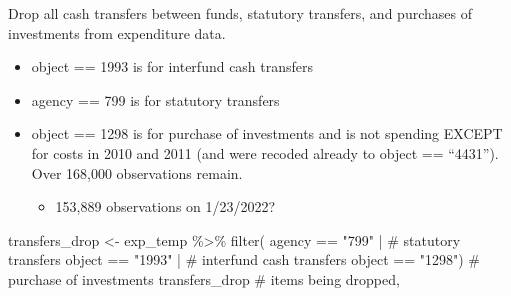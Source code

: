 \documentclass[
  letterpaper,
  DIV=11,
  numbers=noendperiod]{scrreport}
\newenvironment{Shaded}{\begin{snugshade}}{\end{snugshade}}
\newcommand{\CommentTok}[1]{\textcolor[rgb]{0.37,0.37,0.37}{#1}}
\newcommand{\FunctionTok}[1]{\textcolor[rgb]{0.28,0.35,0.67}{#1}}
\newcommand{\NormalTok}[1]{\textcolor[rgb]{0.00,0.23,0.31}{#1}}
\newcommand{\OtherTok}[1]{\textcolor[rgb]{0.00,0.23,0.31}{#1}}
\newcommand{\SpecialCharTok}[1]{\textcolor[rgb]{0.37,0.37,0.37}{#1}}
\newcommand{\StringTok}[1]{\textcolor[rgb]{0.13,0.47,0.30}{#1}}
\providecommand{\tightlist}{%
  \setlength{\itemsep}{0pt}\setlength{\parskip}{0pt}}\usepackage{longtable,booktabs,array}
\begin{document}
Drop all cash transfers between funds, statutory transfers, and
purchases of investments from expenditure data.

\begin{itemize}
\tightlist
\item
  object == 1993 is for interfund cash transfers
\item
  agency == 799 is for statutory transfers
\item
  object == 1298 is for purchase of investments and is not spending
  EXCEPT for costs in 2010 and 2011 (and were recoded already to object
  == ``4431''). Over 168,000 observations remain.

  \begin{itemize}
  \tightlist
  \item
    153,889 observations on 1/23/2022?
  \end{itemize}
\end{itemize}

\begin{Shaded}
\begin{Highlighting}[]
\NormalTok{transfers\_drop }\OtherTok{\textless{}{-}}\NormalTok{ exp\_temp }\SpecialCharTok{\%\textgreater{}\%} \FunctionTok{filter}\NormalTok{(}
\NormalTok{  agency }\SpecialCharTok{==} \StringTok{"799"} \SpecialCharTok{|} \CommentTok{\# statutory transfers}
\NormalTok{           object }\SpecialCharTok{==} \StringTok{"1993"} \SpecialCharTok{|}  \CommentTok{\# interfund cash transfers}
\NormalTok{           object }\SpecialCharTok{==} \StringTok{"1298"}\NormalTok{) }\CommentTok{\# purchase of investments}
\NormalTok{transfers\_drop }\CommentTok{\# items being dropped, }
\end{Highlighting}
\end{Shaded}
\end{document}
